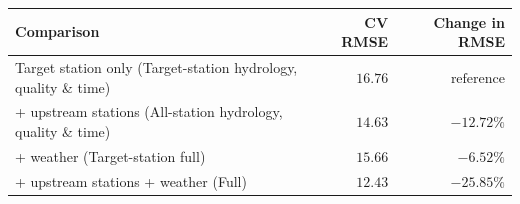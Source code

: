 \begin{tabularx}{\textwidth}{@{}Xrr@{}}
\toprule
\textbf{Comparison} & \textbf{CV RMSE} & \textbf{Change in RMSE} \\
\midrule
Target station only (Target-station hydrology, quality \& time) & $16.76$ & $\text{reference}$ \\
\addlinespace
+ upstream stations (All-station hydrology, quality \& time) & $14.63$ & $-12.72\%$ \\
\addlinespace
+ weather (Target-station full) & $15.66$ & $-6.52\%$ \\
\addlinespace
+ upstream stations + weather (Full) & $12.43$ & $-25.85\%$ \\
\bottomrule
\end{tabularx}
